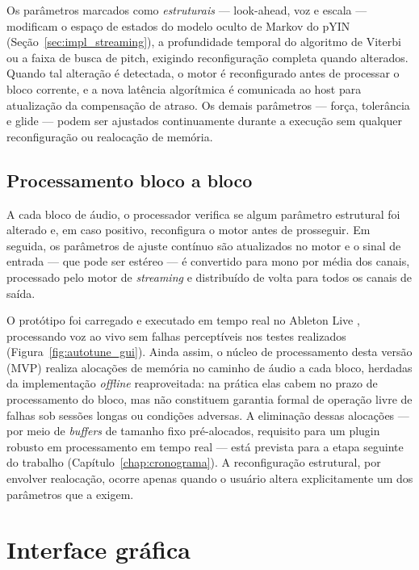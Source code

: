 Os parâmetros marcados como \textit{estruturais} --- look-ahead, voz e escala --- modificam o espaço de estados do modelo oculto de Markov do pYIN (Seção~\ref{sec:impl_streaming}), a profundidade temporal do algoritmo de Viterbi ou a faixa de busca de pitch, exigindo reconfiguração completa quando alterados. Quando tal alteração é detectada, o motor é reconfigurado antes de processar o bloco corrente, e a nova latência algorítmica é comunicada ao host para atualização da compensação de atraso. Os demais parâmetros --- força, tolerância e glide --- podem ser ajustados continuamente durante a execução sem qualquer reconfiguração ou realocação de memória.

\subsection{Processamento bloco a bloco}

A cada bloco de áudio, o processador verifica se algum parâmetro estrutural foi alterado e, em caso positivo, reconfigura o motor antes de prosseguir. Em seguida, os parâmetros de ajuste contínuo são atualizados no motor e o sinal de entrada --- que pode ser estéreo --- é convertido para mono por média dos canais, processado pelo motor de \textit{streaming} e distribuído de volta para todos os canais de saída.

O protótipo foi carregado e executado em tempo real no Ableton Live \cite{ableton_live}, processando voz ao vivo sem falhas perceptíveis nos testes realizados (Figura~\ref{fig:autotune_gui}). Ainda assim, o núcleo de processamento desta versão (MVP) realiza alocações de memória no caminho de áudio a cada bloco, herdadas da implementação \textit{offline} reaproveitada: na prática elas cabem no prazo de processamento do bloco, mas não constituem garantia formal de operação livre de falhas sob sessões longas ou condições adversas. A eliminação dessas alocações --- por meio de \textit{buffers} de tamanho fixo pré-alocados, requisito para um plugin robusto em processamento em tempo real --- está prevista para a etapa seguinte do trabalho (Capítulo~\ref{chap:cronograma}). A reconfiguração estrutural, por envolver realocação, ocorre apenas quando o usuário altera explicitamente um dos parâmetros que a exigem.

\section{Interface gráfica}
\label{sec:impl_gui}

